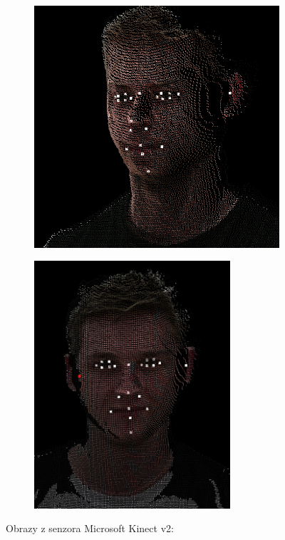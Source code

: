 \begin{figure}[H]
	\centering
	\begin{subfigure}[b]{0.40\textwidth}
		\centering
		\includegraphics[width=\textwidth]{figures/dlib_cloud_a.png}
		\caption{}
		\label{fig:dlib:cloud:a}
	\end{subfigure}
	\hskip 0.2in
	\begin{subfigure}[b]{0.39\textwidth}
		\centering
		\includegraphics[width=0.8\textwidth]{figures/dlib_cloud_b1.png}
		\caption{}
		\label{fig:dlib:cloud:b}
	\end{subfigure}
	\caption{Obrazy z senzora Microsoft Kinect v2: }
	\label{fig:dlib:cloud}
\end{figure}


